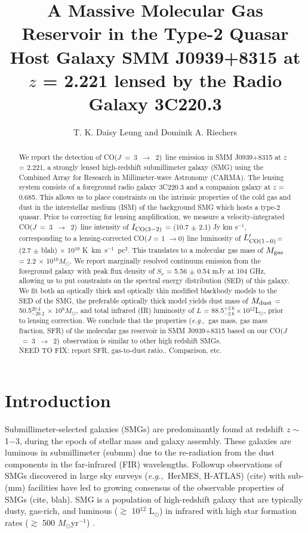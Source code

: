 \documentclass[twocolumn,apj,numberedappendix]{emulateapj}
\newcommand{\Msun}{\mbox{$M_{\odot}$}}
\newcommand{\Lsun}{\mbox{L$_{\odot}$}}
\newcommand{\rarr}{$\rightarrow$}
\newcommand{\CO}{\mbox{CO($J$ = 3 $\rightarrow$ 2) }}
\newcommand{\Lp}{\mbox{$L^{\prime}_{\rm CO(1-0)}$}}
\newcommand{\LpU}{\mbox{K km s$^{-1}$ pc$^2$}}
\newcommand{\eg}{{\sl e.g.,~}}
\newcommand{\pmOne}{$^{-1}$}
\begin{document}
\title{A Massive Molecular Gas Reservoir in the Type-2 Quasar Host Galaxy SMM J0939+8315 at $z$ = 2.221  lensed by the Radio Galaxy 3C220.3}
\author{T. K. Daisy Leung and Dominik A. Riechers}

\begin{abstract}
We report the detection of \CO line emission in SMM J0939+8315 at $z$ = 2.221, a
strongly lensed high-redshift submillimeter galaxy (SMG) using
the Combined Array for Research in Millimeter-wave Astronomy (CARMA). The lensing system consists of a
foreground radio galaxy 3C220.3 and a companion galaxy at $z$ = 0.685. This allows us to place constraints on the intrinsic properties
of the cold gas and dust in the interstellar medium (ISM) of the background SMG which hosts a type-2 quasar. Prior to correcting for lensing 
amplification, we measure a velocity-integrated \CO line intensity of $I_{\rm CO(3-2)}$ = (10.7 $\pm$ 2.1) Jy km s\pmOne,
corresponding to a lensing-corrected CO($J$ = 1 \rarr 0) line luminosity of \Lp = (2.7 $\pm$ 
blah) $\times$ 10$^{10}$ \LpU. This
translates to a molecular gas mass of $M_{\rm gas}$ = 2.2 $\times$ 10$^{10}M_\odot$. We report marginally resolved continuum 
emission from the foreground galaxy with peak flux density of $S_\nu$ = 5.56 $\pm$ 0.54 mJy
 at 104 GHz, allowing us to put constraints on the spectral energy distribution (SED) of this galaxy. We 
fit
 both an optically thick and optically thin modified blackbody models to the SED of the SMG, the preferable optically thick model  yields dust mass of $M_{\rm
dust}$ = 50.5$^{20.4}_{-20.2}$ $\times$ 10$^8$\Msun, and total infrared (IR) luminosity of $L$ = 88.5$^{+2.6}
_{-2.6}\times$10$^{12}$\Lsun, prior to lensing correction. We conclude that the properties (\eg gas mass, gas mass 
fraction, SFR) of the molecular gas reservoir in SMM
J0939+8315 based on our \CO observation is similar to other high redshift
SMGs. \\
NEED TO  FIX: 
report SFR, gas-to-dust ratio.. Comparison, etc. 
\end{abstract}

\section{Introduction}\label{sec:intro}
Submillimeter-selected galaxies (SMGs) are predominantly found at redshift $z \sim$ 1$-$3, during the epoch of stellar mass and 
galaxy assembly. These galaxies are luminous in submillimeter (submm) due to the re-radiation from the dust components in the
 far-infrared (FIR) wavelengths. Followup observations of SMGs discovered in large sky surveys (\eg HerMES, H-ATLAS) (cite) with sub-(mm) facilities have led to growing consensus
  of the observable properties of SMGs (cite, blah). SMG is a population of high-redshift galaxy that are typically dusty, gas-rich, 
  and luminous ($\gtrsim$ 10$^{12}$ \Lsun) in infrared with high star formation rates ($\gtrsim $ 500 \Msun yr\pmOne) \citep[\eg][]{Lagache05a}.
  
\end{document}
